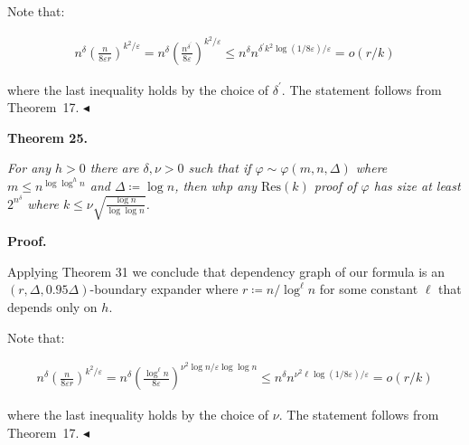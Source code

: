 \documentclass[10pt,a4paper]{article}
\begin{document}
Note that:\par


\[\begin{gathered}
n^{\delta}\left(\frac{n}{8\varepsilon r}\right)^{k^{2}/\varepsilon}=n^{\delta}%
\left(\frac{n^{\delta^{\prime}}}{8\varepsilon}\right)^{k^{2}/\varepsilon}\leq n%
^{\delta}n^{\delta^{\prime}k^{2}\log(1/8\varepsilon)/\varepsilon}=o(r/k)
\end{gathered}\]


where the last inequality holds by the choice of $\delta^{\prime}$. The statement follows from Theorem 17.
$\blacktriangleleft$\par





\par\medskip\noindent\textbf{
\textbf{Theorem 25}\textbf{.}
}\par



\emph{For any $h>0$ there are $\delta,\nu>0$ such that if $\varphi\sim\varphi(m,n,\Delta)$ where
$m\leq n^{\log\log^{h}n}$ and $\Delta\coloneqq\log n$, then whp any $\mathrm{Res}(k)$ proof of $\varphi$ has
size at least $2^{n^{\delta}}$ where $k\leq\nu\sqrt{\frac{\log{n}}{\log\log n}}$.}\par







\par\medskip\noindent\textbf{Proof.}\par




Applying Theorem 31 we conclude that dependency graph of our formula is an
$(r,\Delta,0.95\Delta)$-boundary expander where $r\coloneqq n/\log^{\ell}n$ for some constant
$\ell$ that depends only on $h$.\par




Note that:\par


\[\begin{gathered}
n^{\delta}\left(\frac{n}{8\varepsilon r}\right)^{k^{2}/\varepsilon}=n^{\delta}%
\left(\frac{\log^{\ell}n}{8\varepsilon}\right)^{\nu^{2}\log n/\varepsilon\log%
\log n}\leq n^{\delta}n^{\nu^{2}\ell\log(1/8\varepsilon)/\varepsilon}=o(r/k)
\end{gathered}\]


where the last inequality holds by the choice of $\nu$. The statement follows from Theorem 17.
$\blacktriangleleft$\par
\end{document}
